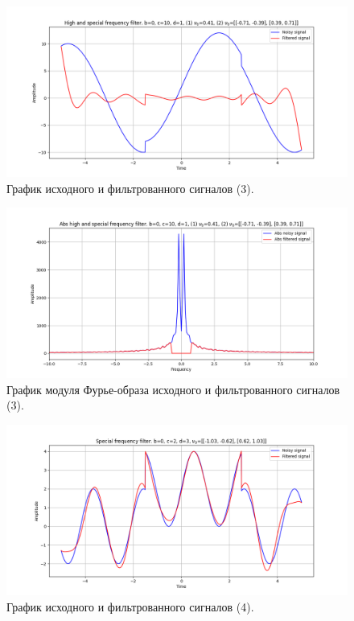 \documentclass[a4paper, 12pt]{article}
\begin{document}
    \begin{figure}[!htb]
        \centering
        \includegraphics[scale=0.48]{3_4_u_flt_u_nospec.png}
        \captionsetup{skip=0pt}
        \caption{График исходного и фильтрованного сигналов (3).}
        \label{fig:fig99}
    \end{figure}
    \begin{figure}[!htb]
        \centering
        \includegraphics[scale=0.48]{3_4_abs_u_U_nospec.png}
        \captionsetup{skip=0pt}
        \caption{График модуля Фурье-образа исходного и фильтрованного сигналов (3).}
        \label{fig:fig100}
    \end{figure}
    \begin{figure}[!htb]
        \centering
        \includegraphics[scale=0.48]{4_u_flt_u_nospec.png}
        \captionsetup{skip=0pt}
        \caption{График исходного и фильтрованного сигналов (4).}
        \label{fig:fig101}
    \end{figure}
\end{document}
